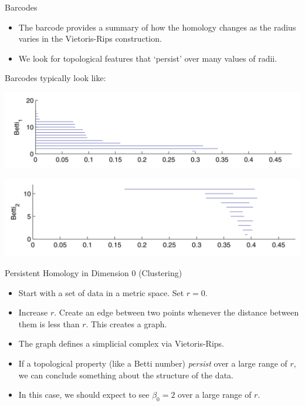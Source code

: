 \documentclass[usenames,dvipsnames,aspectratio=1610]{beamer}
\begin{document}
\begin{frame}{Barcodes}
  \begin{itemize}
    \item The barcode provides a summary of how the homology changes as the
      radius varies in the Vietoris-Rips construction.
    \item We look for topological features that `persist' over many values of radii.
  \end{itemize}

  Barcodes typically look like:

  \begin{minipage}{\textwidth}
  \begin{minipage}{0.5\textwidth}
    \centering
    \includegraphics[scale=0.25]{images/betti1.png}
  \end{minipage}
  \begin{minipage}{0.5\textwidth}
    \centering
    \includegraphics[scale=0.25]{images/betti2.png}
  \end{minipage}
\end{minipage}
\end{frame}
\begin{frame}{Persistent Homology in Dimension 0 (Clustering)}
\begin{center}
\begin{itemize}
\item<1-> Start with a set of data in a metric space. Set $r=0$.
\item<2-> Increase $r$. Create an edge between two points whenever the distance between them is less than $r$. This creates a graph.
\item<3-> The graph defines a simplicial complex via Vietoris-Rips.
\item<4-> If a topological property (like a Betti number) \textit{persist} over a large range of $r$, we can conclude something about the structure of the data.
\item<5-> In this case, we should expect to see $\beta_0=2$ over a large range of $r$. 
\end{itemize}
\end{center}
\end{frame}
\end{document}
